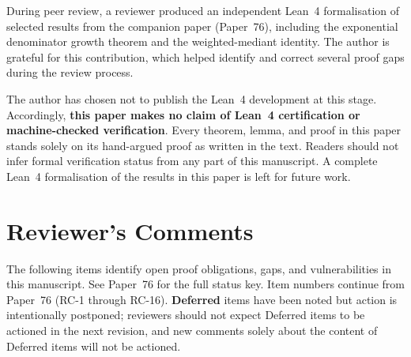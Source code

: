 \documentclass[12pt]{article}
\theoremstyle{definition}
\theoremstyle{remark}
\theoremstyle{plain}
\begin{document}
During peer review, a reviewer produced an independent Lean~4 formalisation
of selected results from the companion paper (Paper~76), including the exponential
denominator growth theorem and the weighted-mediant identity.
The author is grateful for this contribution, which helped identify and
correct several proof gaps during the review process.

The author has chosen not to publish the Lean~4 development at this stage.
Accordingly, \textbf{this paper makes no claim of Lean~4 certification or
machine-checked verification}.
Every theorem, lemma, and proof in this paper stands solely on its
hand-argued proof as written in the text.
Readers should not infer formal verification status from any part of this
manuscript.
A complete Lean~4 formalisation of the results in this paper is left for
future work.

\section*{Reviewer's Comments}
\label{sec:reviewers-comments}

The following items identify open proof obligations, gaps, and vulnerabilities
in this manuscript.  See Paper~76 for the full status key.
Item numbers continue from Paper~76 (RC-1 through RC-16).
\textbf{Deferred} items have been noted but action is intentionally postponed;
reviewers should not expect Deferred items to be actioned in the next revision,
and new comments solely about the content of Deferred items will not be actioned.
\end{document}
